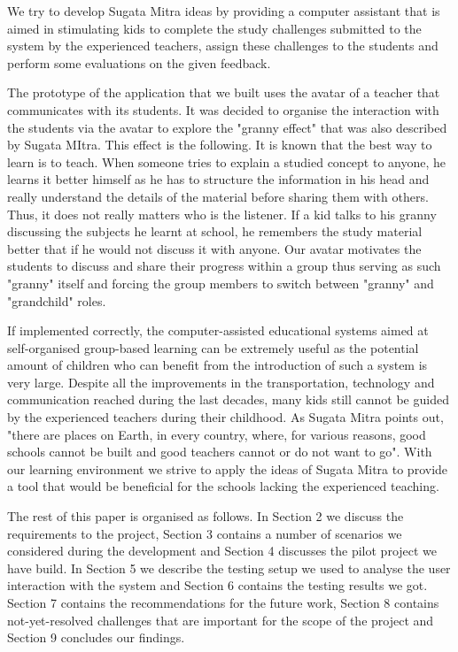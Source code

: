\documentclass[a4paper]{article}
\begin{document}
We try to develop Sugata Mitra ideas by providing a computer assistant that is aimed in stimulating kids to complete the study challenges submitted to the system by the experienced teachers, assign these challenges to the students and perform some evaluations on the given feedback.

The prototype of the application that we built uses the avatar of a teacher that communicates with its students. It was decided to organise the interaction with the students via the avatar to explore the "granny effect" that was also described by Sugata MItra. This effect is the following. It is known that the best way to learn is to teach. When someone tries to explain a studied concept to anyone, he learns it better himself as he has to structure the information in his head and really understand the details of the material before sharing them with others. Thus, it does not really matters who is the listener. If a kid talks to his granny discussing the subjects he learnt at school, he remembers the study material better that if he would not discuss it with anyone. Our avatar motivates the students to discuss and share their progress within a group thus serving as such "granny" itself and forcing the group members to switch between "granny" and "grandchild" roles.

If implemented correctly, the computer-assisted educational systems aimed at self-organised group-based learning can be extremely useful as the potential amount of children who can benefit from the introduction of such a system is very large. Despite all the improvements in the transportation, technology and communication reached during the last decades, many kids still cannot be guided by the experienced teachers during their childhood. As Sugata Mitra points out, "there are places on Earth, in every country, where, for various reasons, good schools cannot be built and good teachers cannot or do not want to go". With our learning environment we strive to apply the ideas of Sugata Mitra to provide a tool that would be beneficial for the schools lacking the experienced teaching.

The rest of this paper is organised as follows. In Section 2 we discuss the requirements to the project, Section 3 contains a number of scenarios we considered during the development and Section 4 discusses the pilot project we have build. In Section 5 we describe the testing setup we used to analyse the user interaction with the system and Section 6 contains the testing results we got. Section 7 contains the recommendations for the future work, Section 8 contains not-yet-resolved challenges that are important for the scope of the project and Section 9 concludes our findings. 
\end{document}
